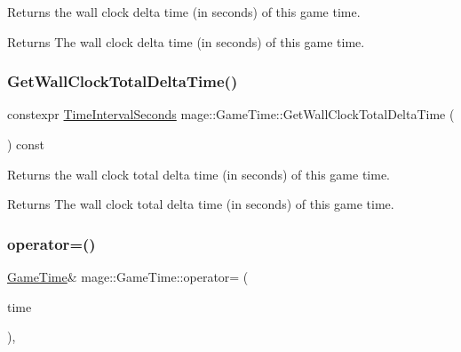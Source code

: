 Returns the wall clock delta time (in seconds) of this game time.

\begin{DoxyReturn}{Returns}
The wall clock delta time (in seconds) of this game time. 
\end{DoxyReturn}
\mbox{\label{classmage_1_1_game_time_ab272459ffe5c8c6637bde001035c3227}} 
\subsubsection{\texorpdfstring{Get\+Wall\+Clock\+Total\+Delta\+Time()}{GetWallClockTotalDeltaTime()}}
{\footnotesize\ttfamily constexpr \mbox{\hyperlink{namespacemage_a21c3d1575018d1e0720948713c76be1f}{Time\+Interval\+Seconds}} mage\+::\+Game\+Time\+::\+Get\+Wall\+Clock\+Total\+Delta\+Time (\begin{DoxyParamCaption}{ }\end{DoxyParamCaption}) const\hspace{0.3cm}{\ttfamily [noexcept]}}

Returns the wall clock total delta time (in seconds) of this game time.

\begin{DoxyReturn}{Returns}
The wall clock total delta time (in seconds) of this game time. 
\end{DoxyReturn}
\mbox{\label{classmage_1_1_game_time_ad589f54fb952e59b30e43e9ebc39ccee}} 
\subsubsection{\texorpdfstring{operator=()}{operator=()}\hspace{0.1cm}{\footnotesize\ttfamily [1/2]}}
{\footnotesize\ttfamily \mbox{\hyperlink{classmage_1_1_game_time}{Game\+Time}}\& mage\+::\+Game\+Time\+::operator= (\begin{DoxyParamCaption}\item[{const \mbox{\hyperlink{classmage_1_1_game_time}{Game\+Time}} \&}]{time }\end{DoxyParamCaption})\hspace{0.3cm}{\ttfamily [default]}, {\ttfamily [noexcept]}}

